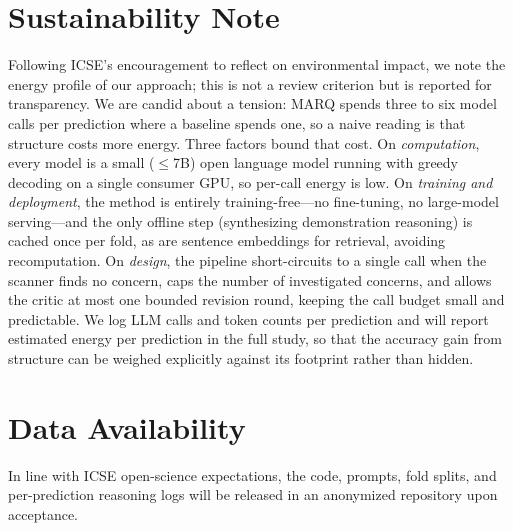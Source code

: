 \documentclass[10pt,conference]{IEEEtran}
\begin{document}
\section*{Sustainability Note}
Following ICSE's encouragement to reflect on environmental impact, we note the energy profile of our approach; this is not a review criterion but is reported for transparency. We are candid about a tension: MARQ spends three to six model calls per prediction where a baseline spends one, so a naive reading is that structure costs more energy. Three factors bound that cost. On \emph{computation}, every model is a small ($\leq$7B) open language model running with greedy decoding on a single consumer GPU, so per-call energy is low. On \emph{training and deployment}, the method is entirely training-free---no fine-tuning, no large-model serving---and the only offline step (synthesizing demonstration reasoning) is cached once per fold, as are sentence embeddings for retrieval, avoiding recomputation. On \emph{design}, the pipeline short-circuits to a single call when the scanner finds no concern, caps the number of investigated concerns, and allows the critic at most one bounded revision round, keeping the call budget small and predictable. We log LLM calls and token counts per prediction and will report estimated energy per prediction in the full study, so that the accuracy gain from structure can be weighed explicitly against its footprint rather than hidden.

\section*{Data Availability}
In line with ICSE open-science expectations, the code, prompts, fold splits, and per-prediction reasoning logs will be released in an anonymized repository upon acceptance.
\end{document}
